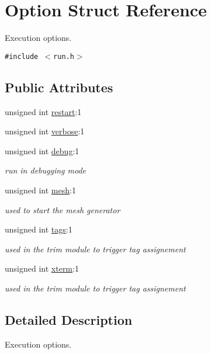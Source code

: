 \hypertarget{structOption}{
\section{Option Struct Reference}
\label{structOption}
}
Execution options.  


{\tt \#include $<$run.h$>$}

\subsection*{Public Attributes}
\begin{CompactItemize}
\item 
unsigned int \hyperlink{structOption_b57904cb40459f49649d4862893bce07}{restart}:1
\item 
unsigned int \hyperlink{structOption_798cf97922f0ec0f4ecc226f52684f41}{verbose}:1
\item 
unsigned int \hyperlink{structOption_745cfac617607ad8812dfaee74040bcd}{debug}:1
\begin{CompactList}\small\item\em run in debugging mode \item\end{CompactList}\item 
unsigned int \hyperlink{structOption_b6d04183bbf7164b8f0df0c5d0943873}{mesh}:1
\begin{CompactList}\small\item\em used to start the mesh generator \item\end{CompactList}\item 
unsigned int \hyperlink{structOption_5b5df1a153576b7ae1716ab8564f1a12}{tags}:1
\begin{CompactList}\small\item\em used in the trim module to trigger tag assignement \item\end{CompactList}\item 
unsigned int \hyperlink{structOption_8eb54edb09717cfc01a421f5610bbb8e}{xterm}:1
\begin{CompactList}\small\item\em used in the trim module to trigger tag assignement \item\end{CompactList}\end{CompactItemize}


\subsection{Detailed Description}
Execution options. 

